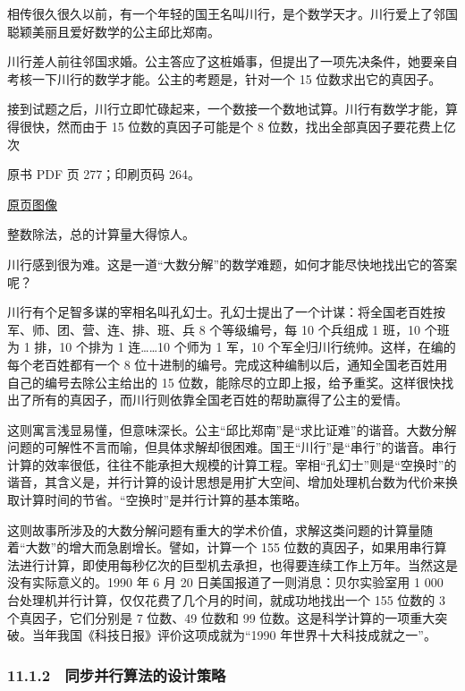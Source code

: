 相传很久很久以前，有一个年轻的国王名叫川行，是个数学天才。川行爱上了邻国聪颖美丽且爱好数学的公主邱比郑南。

川行差人前往邻国求婚。公主答应了这桩婚事，但提出了一项先决条件，她要亲自考核一下川行的数学才能。公主的考题是，针对一个 15 位数求出它的真因子。

接到试题之后，川行立即忙碌起来，一个数接一个数地试算。川行有数学才能，算得很快，然而由于 15 位数的真因子可能是个 8 位数，找出全部真因子要花费上亿次

\clearpage

原书 PDF 页 277；印刷页码 264。

\href{source-images/pdf-277.jpeg}{原页图像}

整数除法，总的计算量大得惊人。

川行感到很为难。这是一道``大数分解''的数学难题，如何才能尽快地找出它的答案呢？

川行有个足智多谋的宰相名叫孔幻士。孔幻士提出了一个计谋：将全国老百姓按军、师、团、营、连、排、班、兵 8 个等级编号，每 10 个兵组成 1 班，10 个班为 1 排，10 个排为 1 连\ldots\ldots10 个师为 1 军，10 个军全归川行统帅。这样，在编的每个老百姓都有一个 8 位十进制的编号。完成这种编制以后，通知全国老百姓用自己的编号去除公主给出的 15 位数，能除尽的立即上报，给予重奖。这样很快找出了所有的真因子，而川行则依靠全国老百姓的帮助赢得了公主的爱情。

这则寓言浅显易懂，但意味深长。公主``邱比郑南''是``求比证难''的谐音。大数分解问题的可解性不言而喻，但具体求解却很困难。国王``川行''是``串行''的谐音。串行计算的效率很低，往往不能承担大规模的计算工程。宰相``孔幻士''则是``空换时''的谐音，其含义是，并行计算的设计思想是用扩大空间、增加处理机台数为代价来换取计算时间的节省。``空换时''是并行计算的基本策略。

这则故事所涉及的大数分解问题有重大的学术价值，求解这类问题的计算量随着``大数''的增大而急剧增长。譬如，计算一个 155 位数的真因子，如果用串行算法进行计算，即使用每秒亿次的巨型机去承担，也得要连续工作上万年。当然这是没有实际意义的。1990 年 6 月 20 日美国报道了一则消息：贝尔实验室用 1 000 台处理机并行计算，仅仅花费了几个月的时间，就成功地找出一个 155 位数的 3 个真因子，它们分别是 7 位数、49 位数和 99 位数。这是科学计算的一项重大突破。当年我国《科技日报》评价这项成就为``1990 年世界十大科技成就之一''。

\subsubsection{11.1.2　同步并行算法的设计策略}\label{ch11-ux540cux6b65ux5e76ux884cux7b97ux6cd5ux7684ux8bbeux8ba1ux7b56ux7565}

